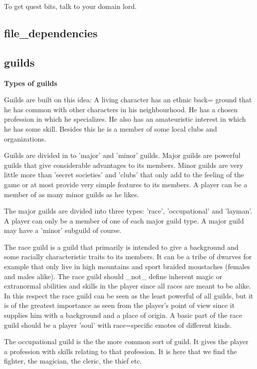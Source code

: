 To get quest bits, talk to your domain lord.


\subsection{file\_dependencies}


\subsection{guilds}

{\bf Types of guilds}


Guilds are built on this idea: A living character has an ethnic back=
ground that he has common with other characters in his neighbourhood.
He has a chosen profession in which he specializes. He also has an
amateuristic interest in which he has some skill. Besides this he is a
member of some local clubs and organizations.

Guilds are divided in to 'major' and 'minor' guilds. Major guilds are
powerful guilds that give considerable advantages to its members.
Minor guilds are very little more than 'secret societies' and 'clubs'
that only add to the feeling of the game or at most provide very
simple features to its members. A player can be a member of as many
minor guilds as he likes.

The major guilds are divided into three types: 'race', 'occupational'
and 'layman'. A player can only be a member of one of each major guild
type. A major guild may have a 'minor' subguild of course.

The race guild is a guild that primarily is intended to give a
background and some racially characteristic traits to its members. It
can be a tribe of dwarves for example that only live in high mountains
and sport braided moustaches (females and males alike). The race guild
should \_not\_ define inherent magic or extranormal abilities and skills
in the player since all races are meant to be alike. In this respect
the race guild can be seen as the least powerful of all guilds, but it
is of the greatest importance as seen from the player's point of view
since it supplies him with a background and a place of origin. A basic
part of the race guild should be a player 'soul' with race=specific
emotes of different kinds. 

The occupational guild is the the more common sort of guild. It gives
the player a profession with skills relating to that profession. It is
here that we find the fighter, the magician, the cleric, the thief etc.

